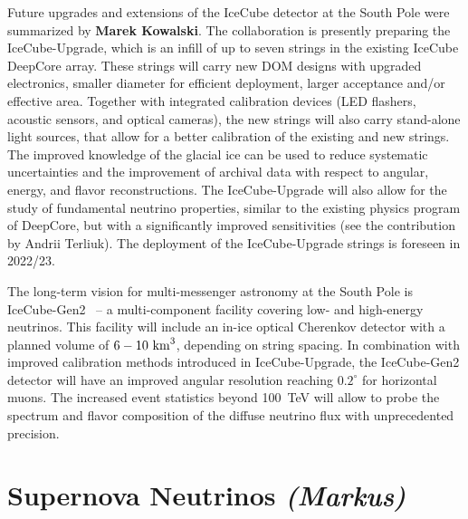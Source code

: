 \documentclass{PoS}
\begin{document}
Future upgrades and extensions of the IceCube detector at the South Pole were summarized by {\bf Marek Kowalski}. The collaboration is presently preparing the IceCube-Upgrade, which is an infill of up to seven strings in the existing IceCube DeepCore array. These strings will carry new DOM designs with upgraded electronics, smaller diameter for efficient deployment, larger acceptance and/or effective area. Together with integrated calibration devices (LED flashers, acoustic sensors, and optical cameras), the new strings will also carry stand-alone light sources, that allow for a better calibration of the existing and new strings. The improved knowledge of the glacial ice can be used to reduce systematic uncertainties and the improvement of archival data with respect to angular, energy, and flavor reconstructions. The IceCube-Upgrade will also allow for the study of fundamental neutrino properties, similar to the existing physics program of DeepCore, but with a significantly improved sensitivities (see the contribution by Andrii Terliuk). The deployment of the IceCube-Upgrade strings is foreseen in 2022/23.

The long-term vision for multi-messenger astronomy at the South Pole is IceCube-Gen2~\cite{Aartsen:2014njl} -- a multi-component facility covering low- and high-energy neutrinos. This facility will include an in-ice optical Cherenkov detector with a planned volume of $6-10~{\rm km}^3$, depending on string spacing. In combination with improved calibration methods introduced in IceCube-Upgrade, the IceCube-Gen2 detector will have an improved angular resolution reaching $0.2^\circ$ for horizontal muons. The increased event statistics beyond 100~TeV will allow to probe the spectrum and flavor composition of the diffuse neutrino flux with unprecedented precision. 

\section{Supernova Neutrinos {\it (Markus)}}
\end{document}

